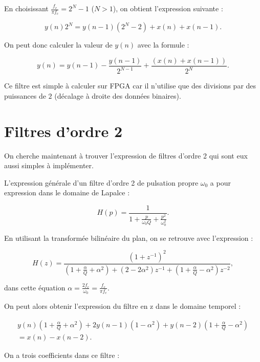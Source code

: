 \documentclass{article}
\begin{document}
En choisissant $\frac{f_e}{\pi f_c}=2^{N}-1$ ($N>1$), on obtient l'expression suivante :

\begin{equation}
y(n)2^N=y(n-1)(2^N-2)+x(n)+x(n-1).
\end{equation}

On peut donc calculer la valeur de $y(n)$ avec la formule :

\begin{equation}
y(n)=y(n-1)-\frac{y(n-1)}{2^{N-1}}+\frac{(x(n)+x(n-1))}{2^N}.
\end{equation}

Ce filtre est simple à calculer sur FPGA car il n'utilise que des divisions par des puissances de $2$ (décalage à droite des données binaires).

\section{Filtres d'ordre 2}

On cherche maintenant à trouver l'expression de filtres d'ordre 2 qui sont eux aussi simples à implémenter.

L'expression générale d'un filtre d'ordre 2 de pulsation propre $\omega_0$ a pour expression dans le domaine de Lapalce :

\begin{equation}
H(p) = \frac{1}{1+\frac{p}{\omega_0 Q}+\frac{p^2}{\omega_0^2}}.
\end{equation}

En utilisant la transformée bilinéaire du plan, on se retrouve avec l'expression :

\begin{equation}
H(z) = \frac{(1+z^{-1})^2}{\left(1+\frac{\alpha}{Q}+\alpha^2 \right)+\left(2-2\alpha^2 \right)z^{-1}+\left(1+\frac{\alpha}{Q}-\alpha^2 \right)z^{-2}},
\end{equation}

dans cette équation $\alpha=\frac{2f_e}{\omega_0}=\frac{f_e}{\pi f_c}$.

On peut alors obtenir l'expression du filtre en z dans le domaine temporel :

\begin{multline}
y(n)\left(1+\frac{\alpha}{Q}+\alpha^2 \right)+2y(n-1)\left(1-\alpha^2 \right)+y(n-2)\left(1+\frac{\alpha}{Q}-\alpha^2 \right) \\
 = x(n)-x(n-2).
\end{multline}

On a trois coefficients dans ce filtre :
\end{document}
